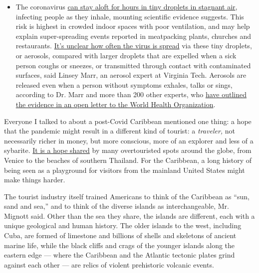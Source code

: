 \begin{itemize}
  \begin{itemize}
  \tightlist
  \item
    The coronavirus
    \href{https://www.nytimes3xbfgragh.onion/2020/07/04/health/239-experts-with-one-big-claim-the-coronavirus-is-airborne.html?action=click\&pgtype=Article\&state=default\&region=MAIN_CONTENT_3\&context=storylines_faq}{can
    stay aloft for hours in tiny droplets in stagnant air}, infecting
    people as they inhale, mounting scientific evidence suggests. This
    risk is highest in crowded indoor spaces with poor ventilation, and
    may help explain super-spreading events reported in meatpacking
    plants, churches and restaurants.
    \href{https://www.nytimes3xbfgragh.onion/2020/07/06/health/coronavirus-airborne-aerosols.html?action=click\&pgtype=Article\&state=default\&region=MAIN_CONTENT_3\&context=storylines_faq}{It's
    unclear how often the virus is spread} via these tiny droplets, or
    aerosols, compared with larger droplets that are expelled when a
    sick person coughs or sneezes, or transmitted through contact with
    contaminated surfaces, said Linsey Marr, an aerosol expert at
    Virginia Tech. Aerosols are released even when a person without
    symptoms exhales, talks or sings, according to Dr. Marr and more
    than 200 other experts, who
    \href{https://academic.oup.com/cid/article/doi/10.1093/cid/ciaa939/5867798}{have
    outlined the evidence in an open letter to the World Health
    Organization}.
  \end{itemize}
\end{itemize}

Everyone I talked to about a post-Covid Caribbean mentioned one thing: a
hope that the pandemic might result in a different kind of tourist: a
\emph{traveler,} not necessarily richer in money, but more conscious,
more of an explorer and less of a sybarite.
\href{https://www.nytimes3xbfgragh.onion/2020/07/02/travel/venice-coronavirus-tourism.html}{It
is a hope shared} by many overtouristed spots around the globe, from
Venice to the beaches of southern Thailand. For the Caribbean, a long
history of being seen as a playground for visitors from the mainland
United States might make things harder.

The tourist industry itself trained Americans to think of the Caribbean
as ``sun, sand and sea,'' and to think of the diverse islands as
interchangeable, Mr. Mignott said. Other than the sea they share, the
islands are different, each with a unique geological and human history.
The older islands to the west, including Cuba, are formed of limestone
and billions of shells and skeletons of ancient marine life, while the
black cliffs and crags of the younger islands along the eastern edge ---
where the Caribbean and the Atlantic tectonic plates grind against each
other --- are relics of violent prehistoric volcanic events.

